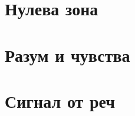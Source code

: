 \chapter{Нулева зона}

\chapter{Разум и чувства}

\chapter{Сигнал от реч}
\label{chap:speech}
    
%     
%     
%     
%     
%     
%     
%     
%     
%     
%     
\printbibliography[heading=bibintoc]